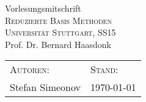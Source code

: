 
\usepackage{mathtools}
\usepackage{pgfplots}



\begin{center}
	Vorlesungsmitschrift\\
	\huge \textsc{Reduzierte Basis Methoden}\\[0.5cm]
	\large \textsc{Universität Stuttgart, SS15}\\
	Prof. Dr. Bernard Haasdonk\\[0.2cm]
\end{center}

\vspace{\baselineskip}

\begin{tabularx}{0.9\textwidth}{Xl}
	\small \textsc{Autoren}: & \textsc{Stand}:\\
	Stefan Simeonov & \today 
\end{tabularx}

\vspace{2\baselineskip}

\tableofcontents

\pagebreak



 

